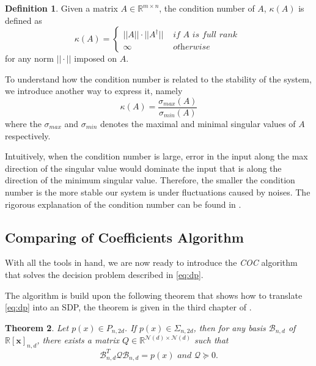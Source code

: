 \documentclass[12pt]{amsart}
\numberwithin{equation}{section}
\newtheorem{thm}{Theorem}
\theoremstyle{definition}
\newtheorem{definition}[thm]{Definition}
\numberwithin{thm}{section}
\begin{document}
\begin{definition}
     \label{def:COND}
     Given a matrix $A \in \mathbb{R}^{m \times n}$, the condition number of $A$, $\kappa(A)$ is defined as
     \begin{equation*}
          \kappa(A) = \begin{cases}
                ||A|| \cdot ||A^\dagger|| & \textit{ if } A \textit{ is full rank } \\
                \infty & \textit{ otherwise }
          \end{cases}
     \end{equation*}
     for any norm $|| \cdot ||$ imposed on $A$.
\end{definition}

To understand how the condition number is related to the stability of the system, we introduce another way to express it, namely
\begin{equation*}
     \kappa(A) = \frac{\sigma_{max} (A)}{\sigma_{min} (A)}
\end{equation*}
where the $\sigma_{max}$ and $\sigma_{min}$ denotes the maximal and minimal singular values of $A$ respectively.

Intuitively, when the condition number is large, error in the input along the max direction of the singular value 
would dominate the input that is along the direction of the minimum singular value. 
Therefore, the smaller the condition number is the more stable our system is under fluctuations caused by noises.
The rigorous explanation of the condition number can be found in \cite{Cheney:Kincaid}.

\subsection{Comparing of Coefficients Algorithm}
With all the tools in hand, we are now ready to introduce the \emph{COC} algorithm that solves the 
decision problem described in \eqref{eq:dp}.

The algorithm is build upon the following theorem that shows how to translate \eqref{eq:dp} into an SDP, the theorem is given in the third chapter of \cite{Blekherman:Parrilo:Thomas}.
\begin{thm}
     \label{thm:key}
     Let $p(x) \in P_{n, 2d}$. If $p(x) \in \Sigma_{n, 2d}$, then for any basis $\mathcal{B}_{n, d}$ of $\mathbb{R}[\mathbf{x}]_{n, d}$, 
     there exists a matrix $Q \in \mathbb{R}^{\mathcal{N}(d) \times \mathcal{N}(d)}$ such that
     \begin{equation}
          \mathcal{B}_{n, d} ^ T \mathcal{Q} \mathcal{B}_{n, d} = p(x) \textit{ and } \mathcal{Q} \succcurlyeq 0 \label{eq:2-4}.
     \end{equation}
\end{thm}
\end{document}
